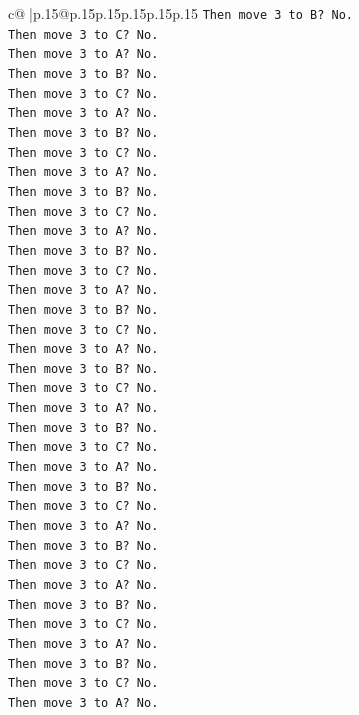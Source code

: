 \documentclass{article}
\begin{document}
{\begin{supertabular}{c@{$\;$}|p{.15\linewidth}@{}p{.15\linewidth}p{.15\linewidth}p{.15\linewidth}p{.15\linewidth}p{.15\linewidth}}
{{{\texttt{Then move 3 to B? No.} \\
\texttt{Then move 3 to C? No.} \\
\texttt{Then move 3 to A? No.} \\
\texttt{Then move 3 to B? No.} \\
\texttt{Then move 3 to C? No.} \\
\texttt{Then move 3 to A? No.} \\
\texttt{Then move 3 to B? No.} \\
\texttt{Then move 3 to C? No.} \\
\texttt{Then move 3 to A? No.} \\
\texttt{Then move 3 to B? No.} \\
\texttt{Then move 3 to C? No.} \\
\texttt{Then move 3 to A? No.} \\
\texttt{Then move 3 to B? No.} \\
\texttt{Then move 3 to C? No.} \\
\texttt{Then move 3 to A? No.} \\
\texttt{Then move 3 to B? No.} \\
\texttt{Then move 3 to C? No.} \\
\texttt{Then move 3 to A? No.} \\
\texttt{Then move 3 to B? No.} \\
\texttt{Then move 3 to C? No.} \\
\texttt{Then move 3 to A? No.} \\
\texttt{Then move 3 to B? No.} \\
\texttt{Then move 3 to C? No.} \\
\texttt{Then move 3 to A? No.} \\
\texttt{Then move 3 to B? No.} \\
\texttt{Then move 3 to C? No.} \\
\texttt{Then move 3 to A? No.} \\
\texttt{Then move 3 to B? No.} \\
\texttt{Then move 3 to C? No.} \\
\texttt{Then move 3 to A? No.} \\
\texttt{Then move 3 to B? No.} \\
\texttt{Then move 3 to C? No.} \\
\texttt{Then move 3 to A? No.} \\
\texttt{Then move 3 to B? No.} \\
\texttt{Then move 3 to C? No.} \\
\texttt{Then move 3 to A? No.} \\
}}}
\end{supertabular}}
\end{document}
